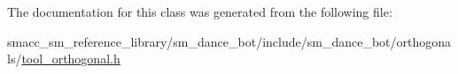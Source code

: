 The documentation for this class was generated from the following file\+:\begin{DoxyCompactItemize}
\item 
smacc\+\_\+sm\+\_\+reference\+\_\+library/sm\+\_\+dance\+\_\+bot/include/sm\+\_\+dance\+\_\+bot/orthogonals/\hyperlink{smacc__sm__reference__library_2sm__dance__bot_2include_2sm__dance__bot_2orthogonals_2tool__orthogonal_8h}{tool\+\_\+orthogonal.\+h}\end{DoxyCompactItemize}
